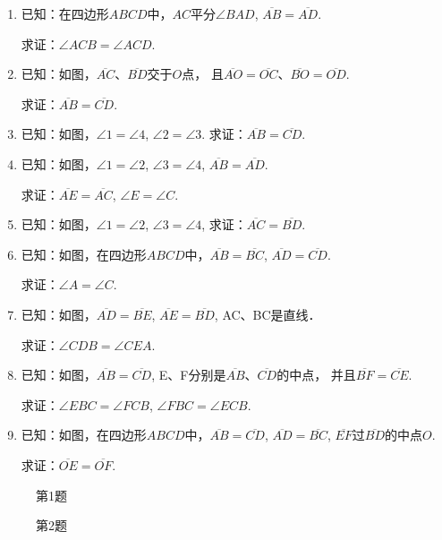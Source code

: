 \begin{ex}
\begin{enumerate}
    \item 已知：在四边形$ABCD$中，$AC$平分$\angle BAD$, $\overline{AB}=\overline{AD}$.
    
    求证：$\angle ACB=\angle ACD$.
    \item 已知：如图，$\overline{AC}$、$\overline{BD}$交于$O$点，    且$\overline{AO}=\overline{OC}$、$\overline{BO}=\overline{OD}$.
    
    求证：$\overline{AB}=\overline{CD}$.


\item 已知：如图，$\angle 1=\angle 4$, $\angle 2=\angle 3$.
求证：$\overline{AB}=\overline{CD}$.
\item 已知：如图，$\angle 1=\angle 2$, $\angle 3=\angle 4$, $\overline{AB}=\overline{AD}$. 

求证：$\overline{AE}=\overline{AC}$, $\angle E=\angle C$.

\item 已知：如图，$\angle 1=\angle 2$, $\angle 3=\angle 4$,
求证：$\overline{AC}=\overline{BD}$.
\item 已知：如图，在四边形$ABCD$中，$\overline{AB}=\overline{BC}$, $\overline{AD}=\overline{CD}$.

求证：$\angle A=\angle C$.
\item 已知：如图，$\overline{AD}=\overline{BE}$, $\overline{AE}=\overline{BD}$, AC、BC是直线．

求证：$\angle CDB=\angle CEA$.
\item 已知：如图，$\overline{AB}=\overline{CD}$, E、F分别是$\overline{AB}$、$\overline{CD}$的中点，
并且$\overline{BF}=\overline{CE}$.

求证：$\angle EBC=\angle FCB$, $\angle FBC=\angle ECB$.

\item 已知：如图，在四边形$ABCD$中，$\overline{AB}=\overline{CD}$, $\overline{AD}=\overline{BC}$, $\overline{EF}$过$\overline{BD}$的中点$O$. 

求证：$\overline{OE}=\overline{OF}$.
\end{enumerate}
\end{ex}

\begin{figure}[htp]\centering
    \begin{minipage}[t]{0.48\textwidth}
    \centering
{}
    \caption*{第1题}
    \end{minipage}
    \begin{minipage}[t]{0.48\textwidth}
    \centering
    \caption*{第2题}
    \end{minipage}
    \end{figure}

